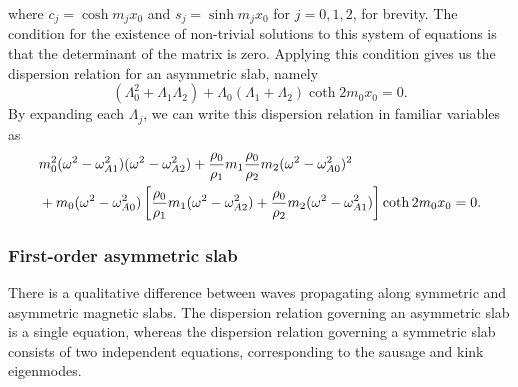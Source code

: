 \documentclass[12pt,draft]{../style-files/ociamthesis}
\begin{document}
where $c_j = \cosh{m_jx_0}$ and $s_j = \sinh{m_jx_0}$ for $j=0,1,2$, for brevity. The condition for the existence of non-trivial solutions to this system of equations is that the determinant of the matrix is zero. Applying this condition gives us the dispersion relation for an asymmetric slab, namely
\begin{equation}
(\Lambda_0^2 + \Lambda_1\Lambda_2) + \Lambda_0(\Lambda_1 + \Lambda_2)\coth{2m_0x_0} = 0. \label{DR lambda}
\end{equation}
By expanding each $\Lambda_j$, we can write this dispersion relation in familiar variables as
\begin{align}
&m_0^2(\omega^2 - \omega_{A1}^2)(\omega^2 - \omega_{A2}^2) + \frac{\rho_0}{\rho_1}m_1\frac{\rho_0}{\rho_2}m_2(\omega^2 - \omega_{A0}^2)^2 \notag \\
& + m_0(\omega^2 - \omega_{A0}^2)\left[\frac{\rho_0}{\rho_1}m_1(\omega^2 - \omega_{A2}^2) + \frac{\rho_0}{\rho_2}m_2(\omega^2 - \omega_{A1}^2)\right]\coth{2m_0x_0} = 0. \label{DR}
\end{align}


\subsubsection{First-order asymmetric slab}

There is a qualitative difference between waves propagating along symmetric and asymmetric magnetic slabs. The dispersion relation governing an asymmetric slab is a single equation, whereas the dispersion relation governing a symmetric slab \citep{rob81a} consists of two independent equations, corresponding to the sausage and kink eigenmodes.
\end{document}
